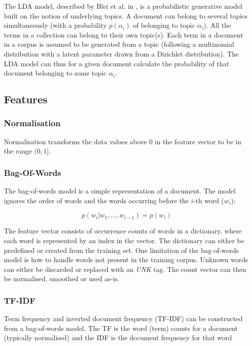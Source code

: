 The LDA model, described by Blei et al. in \cite{Blei2003}, is a probabilistic generative model built on the notion of underlying topics.
A document can belong to several topics simultaneously (with a probability $p(\alpha_i)$ of belonging to topic $\alpha_i$).
All the terms in a collection can belong to their own topic(s).
Each term in a document in a corpus is assumed to be generated from a topic (following a multinomial distribution with a latent parameter drawn from a Dirichlet distribution).
The LDA model can thus for a given document calculate the probability of that document belonging to some topic $\alpha_i$.

\subsection{Features} \label{sec:theory-features}

\subsubsection{Normalisation}
Normalisation transforms the data values above $0$ in the feature vector to be in the range $(0, 1]$.

\subsubsection{Bag-Of-Words} \label{sec:theory-bow}
The bag-of-words model is a simple representation of a document.
The model ignores the order of words and the words occurring before the $i$-th word ($w_i$):

\begin{equation*}
    p(w_i|w_1, \ldots, w_{i-1}) = p(w_i)
\end{equation*}

The feature vector consists of occurrence counts of words in a dictionary, where each word is represented by an index in the vector.
The dictionary can either be predefined or created from the training set.
One limitation of the bag-of-words model is how to handle words not present in the training corpus.
Unknown words can either be discarded or replaced with an \emph{UNK} tag.
The count vector can then be normalised, smoothed or used as-is.

\subsubsection{TF-IDF}
Term frequency and inverted document frequency (TF-IDF) can be constructed from a bag-of-words model.
The TF is the word (term) counts for a document (typically normalised) and the IDF is the document frequency for that word

